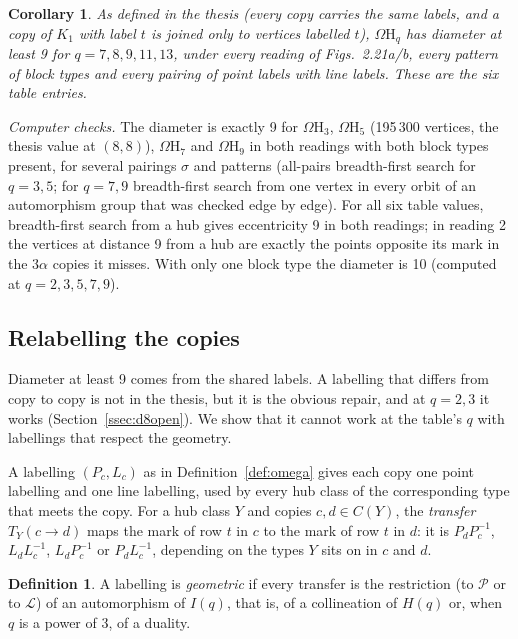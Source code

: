 \documentclass[11pt]{amsart}
\newtheorem{corollary}[theorem]{Corollary}
\theoremstyle{definition}
\newtheorem{definition}[theorem]{Definition}
\theoremstyle{remark}
\numberwithin{equation}{section}
\newcommand{\cL}{\mathcal L}
\newcommand{\cP}{\mathcal P}
\newcommand{\Om}{\Omega\mathrm H}
\begin{document}
\begin{corollary}\label{cor:thesisD8}
As defined in the thesis (every copy carries the same labels, and a copy of $K_1$ with label $t$ is joined only to vertices
labelled $t$), $\Om_q$ has diameter at least 9 for $q=7,8,9,11,13$, under every reading of Figs.~2.21a/b, every pattern of
block types and every pairing of point labels with line labels. These are the six table entries.
\end{corollary}

\emph{Computer checks.} The diameter is exactly 9 for $\Om_3$, $\Om_5$ (195\,300 vertices, the thesis value at $(8,8)$),
$\Om_7$ and $\Om_9$ in both readings with both block types present, for several pairings $\sigma$ and patterns (all-pairs
breadth-first search for $q=3,5$; for $q=7,9$ breadth-first search from one vertex in every orbit of an automorphism group
that was checked edge by edge). For all six table values, breadth-first search from a hub gives eccentricity 9 in both
readings; in reading 2 the vertices at distance 9 from a hub are exactly the points opposite its mark in the $3\alpha$
copies it misses. With only one block type the diameter is 10 (computed at $q=2,3,5,7,9$).

\subsection{Relabelling the copies}\label{ssec:relabel}
Diameter at least 9 comes from the shared labels. A labelling that differs from copy to copy is not in the thesis, but it is
the obvious repair, and at $q=2,3$ it works (Section~\ref{ssec:d8open}). We show that it cannot work at the table's $q$ with
labellings that respect the geometry.

A labelling $(P_c,L_c)$ as in Definition~\ref{def:omega} gives each copy one point labelling and one line labelling, used by
every hub class of the corresponding type that meets the copy. For a hub class $Y$ and copies $c,d\in C(Y)$, the
\emph{transfer} $T_Y(c\to d)$ maps the mark of row $t$ in $c$ to the mark of row $t$ in $d$: it is $P_dP_c^{-1}$,
$L_dL_c^{-1}$, $L_dP_c^{-1}$ or $P_dL_c^{-1}$, depending on the types $Y$ sits on in $c$ and $d$.

\begin{definition}\label{def:geometric}
A labelling is \emph{geometric} if every transfer is the restriction (to $\cP$ or to $\cL$) of an automorphism of $I(q)$,
that is, of a collineation of $H(q)$ or, when $q$ is a power of 3, of a duality.
\end{definition}
\end{document}
